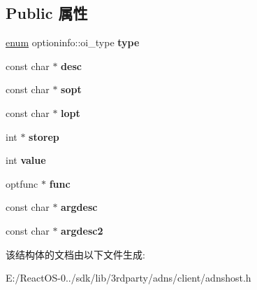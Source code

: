 \subsection*{Public 属性}
\begin{DoxyCompactItemize}
\item 
\mbox{\label{structoptioninfo_acc3e8abffd957bcea5a6507ebe9cb34c}} 
\hyperlink{interfaceenum}{enum} optioninfo\+::oi\+\_\+type {\bfseries type}
\item 
\mbox{\label{structoptioninfo_a888e6150a53ca1a56a3411caaf437a50}} 
const char $\ast$ {\bfseries desc}
\item 
\mbox{\label{structoptioninfo_aa50f1680e760ace9c004ab60d7ce8650}} 
const char $\ast$ {\bfseries sopt}
\item 
\mbox{\label{structoptioninfo_a9c4e81b655f0dd0a9c70da8bc52ad82d}} 
const char $\ast$ {\bfseries lopt}
\item 
\mbox{\label{structoptioninfo_a59e47a31bb0653e4ca42be25521c56ea}} 
int $\ast$ {\bfseries storep}
\item 
\mbox{\label{structoptioninfo_a84f1f22141338cc09032dc52026fdfed}} 
int {\bfseries value}
\item 
\mbox{\label{structoptioninfo_a24dfb79e5f047247d4412048c47ab8bf}} 
optfunc $\ast$ {\bfseries func}
\item 
\mbox{\label{structoptioninfo_a18c1bbc1ef18828649df54c7fca6c8a7}} 
const char $\ast$ {\bfseries argdesc}
\item 
\mbox{\label{structoptioninfo_a1ccd0f5b68a7dfc29ee04c38c4e68201}} 
const char $\ast$ {\bfseries argdesc2}
\end{DoxyCompactItemize}


该结构体的文档由以下文件生成\+:\begin{DoxyCompactItemize}
\item 
E\+:/\+React\+O\+S-\/0../sdk/lib/3rdparty/adns/client/adnshost.\+h\end{DoxyCompactItemize}
